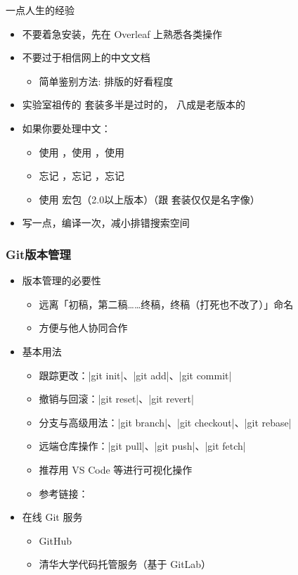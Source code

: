 \begin{frame}{一点人生的经验}
  \begin{itemize}
    \item 不要着急安装，先在 Overleaf 上熟悉各类操作
    \item 不要过于相信网上的中文文档
      \begin{itemize}
        \item 简单鉴别方法: 排版的好看程度
      \end{itemize}
    \item 实验室祖传的 \CTeX{} 套装多半是过时的，\ThuThesis{} 八成是老版本的
    \item 如果你要处理中文：
      \begin{itemize}
        \item 使用 \XeLaTeX{}，使用 \XeLaTeX{}，使用 \XeLaTeX{}
        \item 忘记 ，忘记 ，忘记 
        \item 使用  宏包（2.0以上版本）（跟 \CTeX{} 套装仅仅是名字像）
      \end{itemize}
    \item 写一点，编译一次，减小排错搜索空间
  \end{itemize}
\end{frame}

\begin{frame}[fragile]
  \frametitle{Git版本管理}
  \begin{itemize}
    \item 版本管理的必要性
      \begin{itemize}
        \item 远离「初稿，第二稿……终稿，终稿（打死也不改了）」命名
        \item 方便与他人协同合作
      \end{itemize}
    \item 基本用法
      \begin{itemize}
        \item 跟踪更改：|git init|、|git add|、|git commit|
        \item 撤销与回滚：|git reset|、|git revert|
        \item 分支与高级用法：|git branch|、|git checkout|、|git rebase|
        \item 远端仓库操作：|git pull|、|git push|、|git fetch|
        \item 推荐用 VS Code 等进行可视化操作
        \item 参考链接：
      \end{itemize}
    \item 在线 Git 服务
      \begin{itemize}
        \item GitHub \href{https://github.com}{\faGithub}
        \item 清华大学代码托管服务（基于 GitLab） 
      \end{itemize}
  \end{itemize}
  \end{frame}

